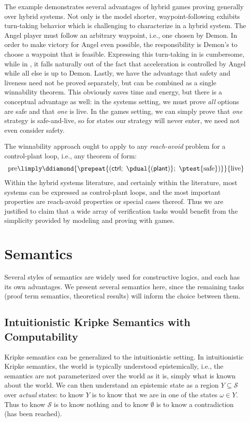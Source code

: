 \documentclass[12pt]{cmuthesis}
\theoremstyle{definition}
\theoremstyle{remark}
\newcommand{\ctrl}{\textsf{ctrl}\xspace}
\newcommand{\plant}{\textsf{plant}\xspace}
\newcommand{\rref}[2][]{\prettyref{#2}}
\newcommand{\allstate}{\mathcal{S}}
\newcommand{\allregion}{\mathcal{X}}
\begin{document}
The example demonstrates several advantages of hybrid games proving generally over hybrid systems.
Not only is the model shorter, waypoint-following exhibits turn-taking behavior which is challenging to characterize in a hybrid system.
The Angel player must follow an arbitrary waypoint, i.e., one chosen by Demon.
In order to make victory for Angel even possible, the responsibility is Demon's to choose a waypoint that is feasible.
Expressing this turn-taking in \rref{thm:live} is cumbersome, while in \rref{thm:angel-wins-gen}, it falls naturally out of the fact that acceleration is controlled by Angel while all else is up to Demon.
Lastly, we have the advantage that safety and liveness need not be proved separately, but can be combined as a single winnability theorem.
This obviously saves time and energy, but there is a conceptual advantage as well: in the systems setting, we must prove \emph{all} options are safe and that \emph{one} is live.
In the games setting, we can simply prove that \emph{one} strategy is safe-and-live, so for states our strategy will never enter, we need not even consider safety.

The winnability approach ought to apply to any \emph{reach-avoid} problem for a control-plant loop, i.e., any theorem of form:
\[\text{pre} \limply \ddiamond{\prepeat{(\ctrl;~\pdual{(\plant)};~\ptest{\text{safe}})}}{\text{live}}\]
Within the hybrid systems literature, and certainly within the \dL literature, most systems can be expressed as control-plant loops, and the most important properties are reach-avoid properties or special cases thereof.
Thus we are justified to claim that a wide array of verification tasks would benefit from the simplicity provided by modeling and proving with games.

\section{Semantics}
Several styles of semantics are widely used for constructive logics, and each has its own advantages.
We present several semantics here, since the remaining tasks (proof term semantics, theoretical results) will inform the choice between them.
\newcommand{\allcon}{\allregion}
\newcommand{\somesemi}[2]{\epsilon #1~|~#2}

\subsection{Intuitionistic Kripke Semantics with Computability}
Kripke semantics can be generalized to the intuitionistic setting.
In intuitionistic Kripke semantics, the world is typically understood epistemically, i.e., the semantics are not parameterized over the world as it is, simply what is known about the world.
We can then understand an epistemic state as a region $Y \subseteq \allstate$ over \emph{actual} states: to know $Y$ is to know that we are in one of the states $\omega \in Y$.
Thus to know $\allstate$ is to know nothing and to know $\emptyset$ is to know a contradiction (has been reached). 
\end{document}

